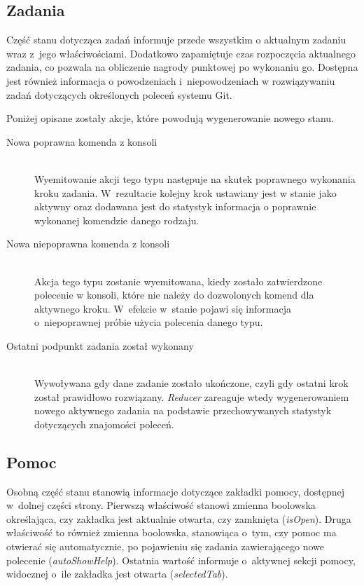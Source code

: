 \documentclass[12pt,a4paper,polish,thesis]{dcsbook}
\begin{document}
{	\subsection{Zadania}
	
	Część stanu dotycząca zadań informuje przede wszystkim o aktualnym zadaniu wraz z~jego właściwościami. Dodatkowo zapamiętuje czas rozpoczęcia aktualnego zadania, co pozwala na obliczenie nagrody punktowej po wykonaniu go. Dostępna jest również informacja o powodzeniach i~niepowodzeniach w rozwiązywaniu zadań dotyczących określonych poleceń systemu Git.
	
	Poniżej opisane zostały akcje, które powodują wygenerowanie nowego stanu.
		
	\begin{description}
	\item[Nowa poprawna komenda z konsoli] \hfill \\
	Wyemitowanie akcji tego typu następuje na skutek poprawnego wykonania kroku zadania. W~rezultacie kolejny krok ustawiany jest w stanie jako aktywny oraz dodawana jest do statystyk informacja o poprawnie wykonanej komendzie danego rodzaju.
	\item[Nowa niepoprawna komenda z konsoli] \hfill \\
	Akcja tego typu zostanie wyemitowana, kiedy zostało zatwierdzone polecenie w konsoli, które nie należy do dozwolonych komend dla aktywnego kroku. W~efekcie w~stanie pojawi się informacja o~niepoprawnej próbie użycia polecenia danego typu.
	\item[Ostatni podpunkt zadania został wykonany] \hfill \\
	Wywoływana gdy dane zadanie zostało ukończone, czyli gdy ostatni krok został prawidłowo rozwiązany. \textit{Reducer} zareaguje wtedy wygenerowaniem nowego aktywnego zadania na podstawie przechowywanych statystyk dotyczących znajomości poleceń.
	\end{description}
		
	\subsection{Pomoc} \label{PomocStan}
	
	Osobną część stanu stanowią informacje dotyczące zakładki pomocy, dostępnej w~dolnej części strony. Pierwszą właściwość stanowi zmienna boolowska określająca, czy zakładka jest aktualnie otwarta, czy zamknięta (\textit{isOpen}). Druga właściwość to również zmienna boolowska, stanowiąca o~tym, czy pomoc ma otwierać się automatycznie, po pojawieniu się zadania zawierającego nowe polecenie (\textit{autoShowHelp}). Ostatnia wartość informuje o~aktywnej sekcji pomocy, widocznej o~ile zakładka jest otwarta (\textit{selectedTab}).
	
}
\end{document}
